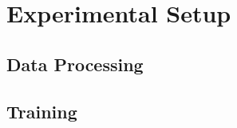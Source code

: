 \section{Experimental Setup}\label{section::experimental_setup}

\subsection{Data Processing}

\subsection{Training}

